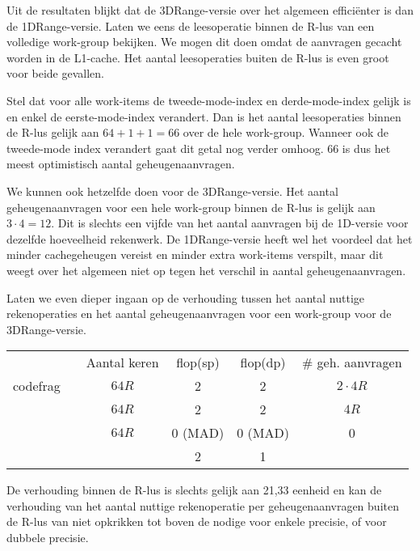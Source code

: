 
Uit de resultaten blijkt dat de 3DRange-versie over het algemeen effici\"enter is dan de 1DRange-versie. Laten we eens de leesoperatie binnen de R-lus van een volledige work-group bekijken. We mogen dit doen omdat de aanvragen gecacht worden in de L1-cache. Het aantal leesoperaties buiten de R-lus is even groot voor beide gevallen.

Stel dat voor alle work-items de tweede-mode-index en derde-mode-index gelijk is en enkel de eerste-mode-index verandert. Dan is het aantal leesoperaties binnen de R-lus gelijk aan $64 + 1 + 1 = 66$ over de hele work-group. Wanneer ook de tweede-mode index verandert gaat dit getal nog verder omhoog. 66 is dus het meest optimistisch aantal geheugenaanvragen.

We kunnen ook hetzelfde doen voor de 3DRange-versie. Het aantal geheugenaanvragen voor een hele work-group binnen de R-lus is gelijk aan $3 \cdot 4 = 12$. Dit is slechts een vijfde van het aantal aanvragen bij de 1D-versie voor dezelfde hoeveelheid rekenwerk. De 1DRange-versie heeft wel het voordeel dat het minder cachegeheugen vereist en minder extra work-items verspilt, maar dit weegt over het algemeen niet op tegen het verschil in aantal geheugenaanvragen.


Laten we even dieper ingaan op de verhouding tussen het aantal nuttige rekenoperaties en het aantal geheugenaanvragen voor een work-group voor de 3DRange-versie.
\begin{tabular}{|r l|c| c| c|c|}
\hline
					&							&	Aantal keren		& flop(sp)	& flop(dp) 	& \# geh. aanvragen	\\
codefrag			&							&	$64 R$				& 2			& 2			&	$2\cdot4R$		\\
					&							&	$64 R$				& 2			& 2			& 	$4R$				\\
					&							&	$64 R$				& 0 (MAD)	& 0 (MAD)	& 	0				\\
\hline
					&							& 						& 2			& 1			&					\\
\end{tabular}
De verhouding binnen de R-lus is slechts gelijk aan 21,33 \todo eenheid en kan de verhouding van het aantal nuttige rekenoperatie per geheugenaanvragen buiten de R-lus van  niet opkrikken tot boven de nodige  voor enkele precisie, of  voor dubbele precisie.


